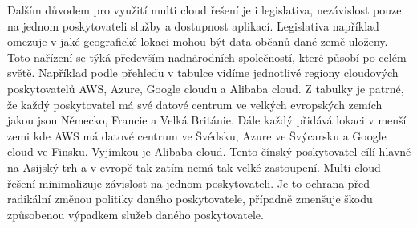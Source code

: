 	Dalším důvodem pro využití multi cloud řešení je i legislativa, nezávislost pouze na jednom poskytovateli služby a dostupnost aplikací. Legislativa například omezuje v jaké geografické lokaci mohou být data občanů dané země uloženy. Toto nařízení se týká především nadnárodních společností, které působí po celém světě. Například podle přehledu v tabulce vidíme jednotlivé regiony cloudových poskytovatelů AWS, Azure, Google cloudu a Alibaba cloud. Z tabulky je patrné, že každý poskytovatel má své datové centrum ve velkých evropských zemích jakou jsou Německo, Francie a Velká Británie. Dále každý přidává lokaci v menší zemi kde AWS má datové centrum ve Švédsku, Azure ve Švýcarsku a Google cloud ve Finsku. Vyjímkou je Alibaba cloud. Tento čínský poskytovatel cílí hlavně na Asijský trh a v evropě tak zatím nemá tak velké zastoupení. Multi cloud řešení minimalizuje závislost na jednom poskytovateli. Je to ochrana před radikální změnou politiky daného poskytovatele, případně zmenšuje škodu způsobenou výpadkem služeb daného poskytovatele.


